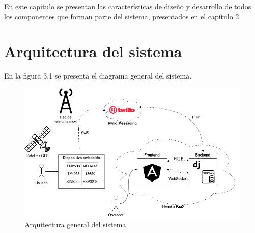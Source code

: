 En este capítulo se presentan las características de diseño y desarrollo de todos los componentes que forman parte del sistema, presentados en el capítulo 2.

\section{Arquitectura del sistema}

En la figura 3.1 se presenta el diagrama general del sistema.

\begin{figure}[H]
	\centering
	\includegraphics[width=1\textwidth]{./Figures/arquitectura.png}
	\caption{Arquitectura general del sistema}
	\label{fig:texmaker}
\end{figure}


